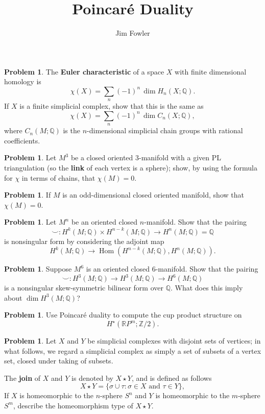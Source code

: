 \documentclass[12pt]{handout}
\title{Poincar\'e Duality}
\author{Jim Fowler}
\theoremstyle{definition}
\newtheorem{problem}[theorem]{Problem}
\DeclareMathOperator{\Hom}{Hom}
\newcommand{\Q}{\mathbb{Q}}
\newcommand{\Z}{\mathbb{Z}}
\newcommand{\RP}{\mathbb{R}P}
\begin{document}
\maketitle

\begin{problem}
  The \textbf{Euler characteristic} of a space $X$ with finite dimensional homology is
  $$
  \chi(X) = \sum_{n} (-1)^n \, \dim H_n(X;\Q).
  $$
  If $X$ is a finite simplicial complex, show that this is the same as
  $$
  \chi(X) = \sum_{n} (-1)^n \, \dim C_n(X;\Q),
  $$
  where $C_n(M;\Q)$ is the $n$-dimensional simplicial chain groups with rational coefficients.
\end{problem}

\begin{problem}
  Let $M^3$ be a closed oriented 3-manifold with a given PL
  triangulation (so the \textbf{link} of each vertex is a sphere);
  show, by using the formula for $\chi$ in terms of chains, that
  $\chi(M) = 0$.
\end{problem}

\begin{problem}
  If $M$ is an odd-dimensional closed oriented manifold, show that
  $\chi(M) = 0$.
\end{problem}


\begin{problem}
  Let $M^n$ be an oriented closed $n$-manifold.  Show that the pairing
  $$
  \smallsmile : H^k(M;\Q) \times H^{n-k}(M;\Q) \to H^n(M;\Q) = \Q
  $$
  is nonsingular form by considering the adjoint map
  $$
  H^k(M;\Q) \to \Hom(H^{n-k}(M;\Q), H^n(M;\Q)).
  $$
\end{problem}


\begin{problem}
  Suppose $M^{6}$ is an oriented closed $6$-manifold.  Show that the pairing
$$
\smallsmile : H^{3}(M;\Q) \to H^{3}(M;\Q) \to H^{6}(M;\Q)
$$
is a nonsingular skew-symmetric bilinear form over $\Q$.  What does this imply about $\dim H^3(M;\Q)$?
\end{problem}


\begin{problem}
  Use Poincar\'e duality to compute the cup product structure on
$$
H^\star(\RP^m;\Z/2).
$$
\end{problem}


\begin{problem}
  Let $X$ and $Y$ be simplicial complexes with disjoint sets of
  vertices; in what follows, we regard a simplicial complex as simply
  a set of subsets of a vertex set, closed under taking of subsets.

  The \textbf{join} of $X$ and $Y$ is denoted by $X \star Y$, and is
  defined as follows
  $$
  X \star Y = \{ \sigma \cup \tau : \sigma \in X \mbox{ and } \tau \in Y
  \},
  $$
  If $X$ is homeomorphic to the $n$-sphere $S^n$ and $Y$ is homeomorphic
  to the $m$-sphere $S^m$, describe the homeomorphism type of $X \star
  Y$.
\end{problem}
\end{document}
